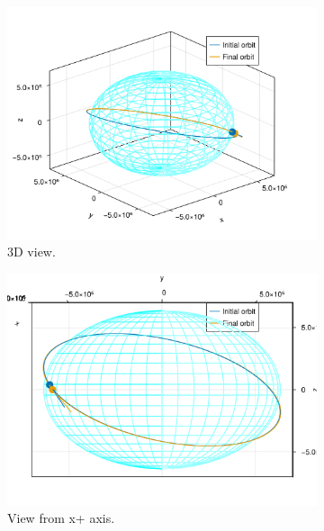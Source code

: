 \begin{figure}[htbp]
    \centering
    \begin{subfigure}{0.49\linewidth}
        \includegraphics[width=\linewidth]{../results/two_body/ipv_noncop/scenario_3d.png}
        \caption{3D view.}
    \end{subfigure}
    \begin{subfigure}{0.49\linewidth}
        \includegraphics[width=\linewidth]{../results/two_body/ipv_noncop/scenario_x+.png}
        \caption{View from x+ axis.}
    \end{subfigure}
    \begin{subfigure}{0.49\linewidth}

\end{subfigure}
\end{figure}
